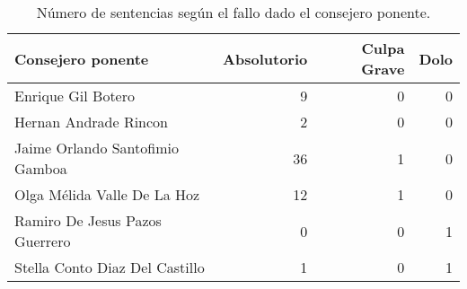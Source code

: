 \begin{table}[!htbp]
\centering
\caption{Número de sentencias según el fallo dado el consejero ponente.} 
\label{tab:consejerofallo}
\begin{tabular}{lrrr}
  \hline
Consejero ponente & Absolutorio & Culpa Grave & Dolo \\ 
  \hline
Enrique Gil Botero &  9 &  0 &  0 \\ 
  Hernan Andrade Rincon &  2 &  0 &  0 \\ 
  Jaime Orlando Santofimio Gamboa & 36 &  1 &  0 \\ 
  Olga Mélida Valle De La Hoz & 12 &  1 &  0 \\ 
  Ramiro De Jesus Pazos Guerrero &  0 &  0 &  1 \\ 
  Stella Conto Diaz Del Castillo &  1 &  0 &  1 \\ 
   \hline
\end{tabular}
\end{table}

